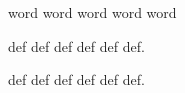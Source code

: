 word word word
word word

\begin{group}
\begin{definition}
  def def def
  def
  def def.
\end{definition}


\begin{example}
  def def def
  def
  def def.
\end{example}

\end{group}
